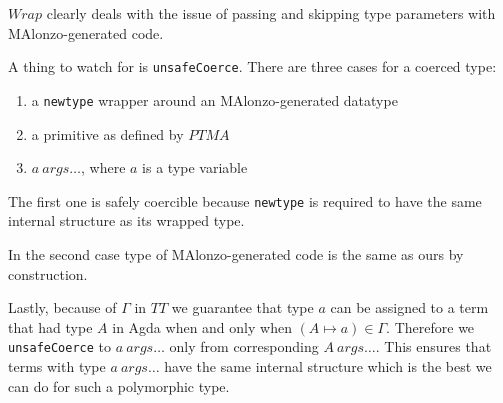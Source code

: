 \(Wrap\) clearly deals with the issue of passing and skipping type parameters with
MAlonzo-generated code.

A thing to watch for is \texttt{unsafeCoerce}.
There are three cases for a coerced type:
\begin{enumerate}
\item a \texttt{newtype} wrapper around an MAlonzo-generated datatype
\item a primitive as defined by \(PTMA\)
\item \(a\ args\ldots\), where \(a\) is a type variable
\end{enumerate}

The first one is safely coercible because \texttt{newtype} is required to have the same
internal structure as its wrapped type.

In the second case type of MAlonzo-generated code is the same as ours by construction.

Lastly, because of \(\Gamma\) in \(TT\) we guarantee that type \(a\) can be assigned to
a term that had type \(A\) in Agda when and only when \((A \mapsto a) \in \Gamma\). Therefore we
\texttt{unsafeCoerce} to \(a\ args\ldots\) only from corresponding \(A\ args\ldots\).
This ensures that terms with type \(a\ args\ldots\) have the same internal structure
which is the best we can do for such a polymorphic type.
